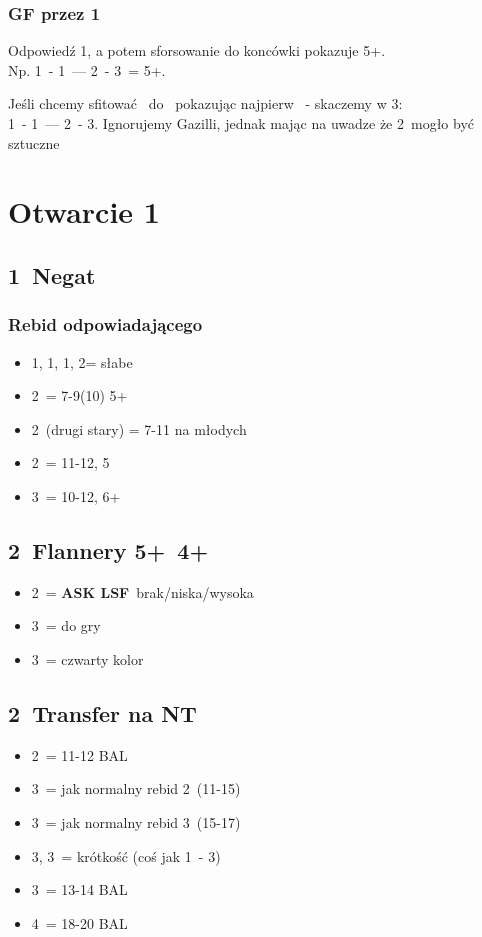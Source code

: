 \documentclass[12pt, a4paper]{article}
\newcommand{\lsf}{\color{WildStrawberry}\textbf{ASK LSF}\color{black}}
\begin{document}
\subsubsection*{GF przez 1\spades}
    Odpowiedź 1\spades, a potem sforsowanie do koncówki pokazuje 5+\spades. \\
    Np. 1\diams\ - 1\spades\ --- 2\diams\ - 3\clubs\ = 5+\spades. \br

    Jeśli chcemy sfitować \hearts\ do \gf\ pokazując najpierw \spades\ - skaczemy w 3\hearts:\\
    1\hearts\ - 1\spades\ --- 2\clubs\ - 3\hearts. Ignorujemy Gazilli, jednak mając na uwadze że 2\clubs\ mogło być sztuczne




\pagebreak
\section{Otwarcie 1\clubs}
\subsection*{1\diams\ Negat}
\subsubsection*{Rebid odpowiadającego}
\begin{itemize}
    \item 1\hearts, 1\spades, 1\nt, 2\clubs = słabe
    \item 2\diams\ = 7-9(10) 5+\diams
    \item 2\major\ (drugi stary) = 7-11 na młodych
    \item 2\nt\ = 11-12, 5\diams
    \item 3\diams\ = 10-12, 6+\diams
\end{itemize}

\subsection*{2\hearts\ Flannery 5+\spades\ 4+\hearts}
\begin{itemize}
    \item 2\nt\ = \lsf\ brak/niska/wysoka
    \item 3\clubs\ = do gry
    \item 3\diams\ = czwarty kolor \gf
\end{itemize}

\subsection*{2\spades\ Transfer na NT}
\begin{itemize}
    \item 2\nt\ = 11-12 BAL
    \item 3\clubs\ = jak normalny rebid 2\clubs\ (11-15)
    \item 3\diams\ = jak normalny rebid 3\clubs\ (15-17)
    \item 3\hearts, 3\spades\ = krótkość (coś jak 1\nt\ - 3\hearts)
    \item 3\nt\ = 13-14 BAL
    \item 4\nt\ = 18-20 BAL
\end{itemize}
\end{document}
